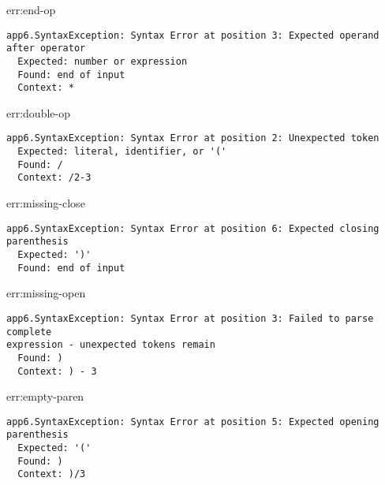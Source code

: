 \begin{error}{err:end-op}
\begin{verbatim}
app6.SyntaxException: Syntax Error at position 3: Expected operand after operator
  Expected: number or expression
  Found: end of input
  Context: *
\end{verbatim}
\end{error}

\begin{error}{err:double-op}
\begin{verbatim}
app6.SyntaxException: Syntax Error at position 2: Unexpected token
  Expected: literal, identifier, or '('
  Found: /
  Context: /2-3
\end{verbatim}
\end{error}

\begin{error}{err:missing-close}
\begin{verbatim}
app6.SyntaxException: Syntax Error at position 6: Expected closing parenthesis
  Expected: ')'
  Found: end of input
\end{verbatim}
\end{error}

\begin{error}{err:missing-open}
\begin{verbatim}
app6.SyntaxException: Syntax Error at position 3: Failed to parse complete
expression - unexpected tokens remain
  Found: )
  Context: ) - 3
\end{verbatim}
\end{error}

\begin{error}{err:empty-paren}
\begin{verbatim}
app6.SyntaxException: Syntax Error at position 5: Expected opening parenthesis
  Expected: '('
  Found: )
  Context: )/3
\end{verbatim}
\end{error}



